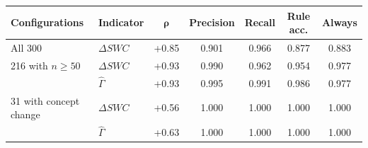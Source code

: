 \begin{tabular}{@{}llccccc@{}}
\toprule
\textbf{Configurations} & \textbf{Indicator} & $\boldsymbol{\rho}$ & \textbf{Precision} & \textbf{Recall} & \textbf{Rule acc.} & \textbf{Always}\\
\midrule
All 300 & $\Delta SWC$ & +0.85 & 0.901 & 0.966 & 0.877 & 0.883\\
216 with $n\ge 50$ & $\Delta SWC$ & +0.93 & 0.990 & 0.962 & 0.954 & 0.977\\
 & $\widehat{\Gamma}$ & +0.93 & 0.995 & 0.991 & 0.986 & 0.977\\
31 with concept change & $\Delta SWC$ & +0.56 & 1.000 & 1.000 & 1.000 & 1.000\\
 & $\widehat{\Gamma}$ & +0.63 & 1.000 & 1.000 & 1.000 & 1.000\\
\bottomrule
\end{tabular}
